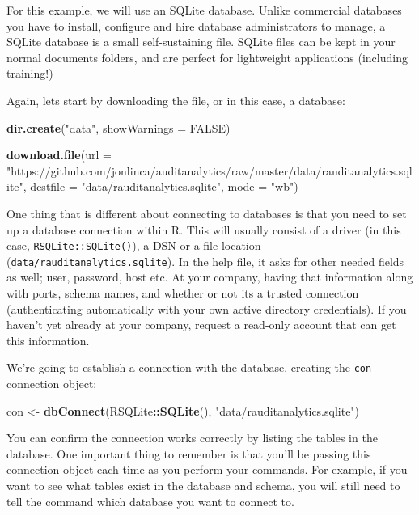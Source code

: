 \documentclass[
]{book}
\newenvironment{Shaded}{\begin{snugshade}}{\end{snugshade}}
\newcommand{\DataTypeTok}[1]{\textcolor[rgb]{0.13,0.29,0.53}{#1}}
\newcommand{\KeywordTok}[1]{\textcolor[rgb]{0.13,0.29,0.53}{\textbf{#1}}}
\newcommand{\NormalTok}[1]{#1}
\newcommand{\OperatorTok}[1]{\textcolor[rgb]{0.81,0.36,0.00}{\textbf{#1}}}
\newcommand{\OtherTok}[1]{\textcolor[rgb]{0.56,0.35,0.01}{#1}}
\newcommand{\StringTok}[1]{\textcolor[rgb]{0.31,0.60,0.02}{#1}}
\begin{document}
For this example, we will use an SQLite database. Unlike commercial databases you have to install, configure and hire database administrators to manage, a SQLite database is a small self-sustaining file. SQLite files can be kept in your normal documents folders, and are perfect for lightweight applications (including training!)

Again, lets start by downloading the file, or in this case, a database:

\begin{Shaded}
\begin{Highlighting}[]
\KeywordTok{dir.create}\NormalTok{(}\StringTok{"data"}\NormalTok{, }\DataTypeTok{showWarnings =} \OtherTok{FALSE}\NormalTok{)}

\KeywordTok{download.file}\NormalTok{(}\DataTypeTok{url =} \StringTok{"https://github.com/jonlinca/auditanalytics/raw/master/data/rauditanalytics.sqlite"}\NormalTok{,}
             \DataTypeTok{destfile =} \StringTok{"data/rauditanalytics.sqlite"}\NormalTok{, }\DataTypeTok{mode =} \StringTok{"wb"}\NormalTok{)}
\end{Highlighting}
\end{Shaded}

One thing that is different about connecting to databases is that you need to set up a database connection within R. This will usually consist of a driver (in this case, \texttt{RSQLite::SQLite()}), a DSN or a file location (\texttt{data/rauditanalytics.sqlite}). In the help file, it asks for other needed fields as well; user, password, host etc. At your company, having that information along with ports, schema names, and whether or not its a trusted connection (authenticating automatically with your own active directory credentials). If you haven't yet already at your company, request a read-only account that can get this information.

We're going to establish a connection with the database, creating the \texttt{con} connection object:

\begin{Shaded}
\begin{Highlighting}[]
\NormalTok{con <-}\StringTok{ }\KeywordTok{dbConnect}\NormalTok{(RSQLite}\OperatorTok{::}\KeywordTok{SQLite}\NormalTok{(), }\StringTok{"data/rauditanalytics.sqlite"}\NormalTok{)}
\end{Highlighting}
\end{Shaded}

You can confirm the connection works correctly by listing the tables in the database. One important thing to remember is that you'll be passing this connection object each time as you perform your commands. For example, if you want to see what tables exist in the database and schema, you will still need to tell the command which database you want to connect to.
\end{document}
